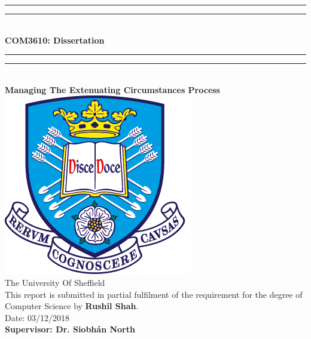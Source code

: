 \documentclass[../main.tex]{subfiles}
\begin{document}
\begin{center}
\rule[0.5ex]{\linewidth}{2pt}\vspace*{-\baselineskip}\vspace*{3.2pt}
\rule[0.5ex]{\linewidth}{1pt}\\[\baselineskip]

\textbf{ {\LARGE COM3610: Dissertation}}\\[2mm]

\rule[0.5ex]{\linewidth}{1pt}\vspace*{-\baselineskip}\vspace{3.2pt}
\rule[0.5ex]{\linewidth}{2pt}\\[4mm]

\textbf{{\large Managing The Extenuating Circumstances Process}}\\[20mm]


\includegraphics[scale=2]{images/TuosLogo.png}\\[12mm]

{\LARGE The University Of Sheffield}\\[2mm]
This report is submitted in partial fulfilment of the requirement for the degree of Computer Science by \textbf{Rushil Shah}.\\[2mm]

Date: 03/12/2018\\[20mm]
{\large \textbf{Supervisor: Dr. Siobhán North}}

\end{center}





%
%
%
\end{document}
